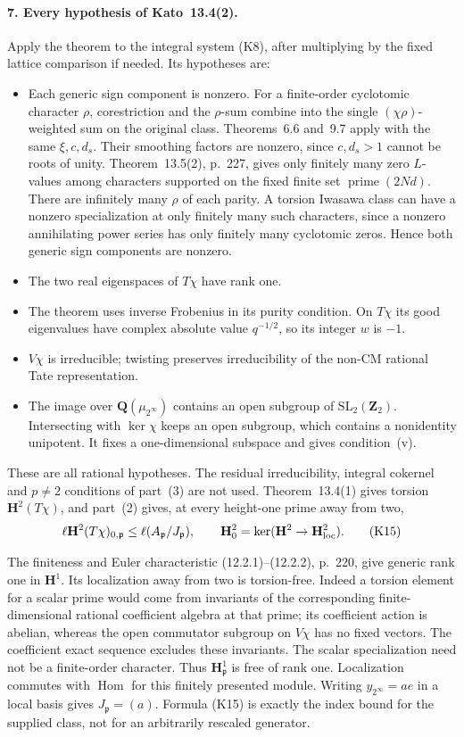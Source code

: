 \paragraph{7. Every hypothesis of Kato~13.4(2).}
Apply the theorem to the integral system (K8), after multiplying
by the fixed lattice comparison if needed. Its hypotheses are:
\begin{itemize}
\item Each generic sign component is nonzero. For a finite-order
cyclotomic character $\rho$, corestriction and the $\rho$-sum combine
into the single $(\chi\rho)$-weighted sum on the original class.
Theorems~6.6 and~9.7 apply with the same $\xi,c,d_s$. Their smoothing
factors are nonzero, since $c,d_s>1$ cannot be roots of unity.
Theorem~13.5(2), p.~227, gives only finitely many zero $L$-values
among characters supported on the fixed finite set
$\operatorname{prime}(2Nd)$. There are infinitely many $\rho$ of
each parity. A torsion Iwasawa class can have a nonzero specialization
at only finitely many such characters, since a nonzero annihilating
power series has only finitely many cyclotomic zeros. Hence both
generic sign components are nonzero.
\item The two real eigenspaces of $T\chi$ have rank one.
\item The theorem uses inverse Frobenius in its purity condition.
On $T\chi$ its good eigenvalues have complex absolute value
$q^{-1/2}$, so its integer $w$ is $-1$.
\item $V\chi$ is irreducible; twisting preserves irreducibility of
the non-CM rational Tate representation.
\item The image over $\mathbf Q(\mu_{2^\infty})$ contains an open
subgroup of $\mathrm{SL}_2(\mathbf Z_2)$. Intersecting with
$\ker\chi$ keeps an open subgroup, which contains a nonidentity
unipotent. It fixes a one-dimensional subspace and gives condition~(v).
\end{itemize}
These are all rational hypotheses. The residual irreducibility,
integral cokernel and $p\ne2$ conditions of part~(3) are not used.
Theorem~13.4(1) gives torsion $\mathbf H^2(T\chi)$, and part~(2)
gives, at every height-one prime away from two,
\[
 \ell\mathbf H^2(T\chi)_{0,\mathfrak p}
       \leq\ell(A_{\mathfrak p}/J_{\mathfrak p}),\qquad
 \mathbf H^2_0=\ker(\mathbf H^2\to\mathbf H^2_{\rm loc}). \tag{K15}
\]

The finiteness and Euler characteristic (12.2.1)--(12.2.2), p.~220,
give generic rank one in $\mathbf H^1$. Its localization away
from two is torsion-free. Indeed a torsion element for a scalar
prime would come from invariants of the corresponding finite-dimensional
rational coefficient algebra at that prime; its coefficient action is
abelian, whereas the open commutator subgroup on $V\chi$ has no
fixed vectors. The coefficient exact sequence excludes these
invariants. The scalar specialization need not be a finite-order
character. Thus $\mathbf H^1_{\mathfrak p}$ is free of rank one.
Localization commutes with $\operatorname{Hom}$ for this finitely
presented module. Writing $y_{2^\infty}=a e$ in a local basis gives
$J_{\mathfrak p}=(a)$. Formula (K15) is exactly the index bound for
the supplied class, not for an arbitrarily rescaled generator.

